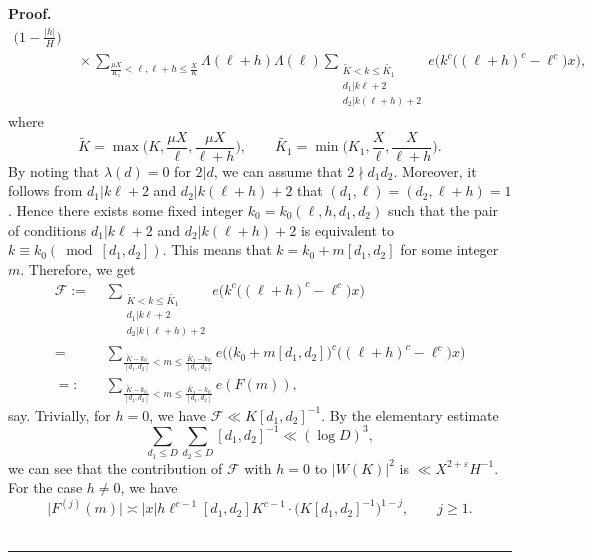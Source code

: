 \documentclass[a4paper,oneside,11pt]{article}%
\newenvironment{proof}[1][Proof]{\noindent \textbf{#1.} }{\  \rule{0.5em}{0.5em}}
\numberwithin{equation}{section}
\begin{document}
\begin{proof}
\begin{align*}
            \bigg(1-\frac{|h|}{H}\bigg)
                 \nonumber \\
 & \,\, \times\sum_{\frac{\mu X}{K_1}<\ell,\ell+h\leqslant\frac{X}{K}}\Lambda(\ell+h)\Lambda(\ell)
        \sum_{\substack{\widetilde{K}<k\leqslant\widetilde{K_1}\\ d_1|k\ell+2\\ d_2|k(\ell+h)+2}}
        e\Big(k^c\big((\ell+h)^c-\ell^c\big)x\Big),
\end{align*}
where
\begin{equation*}
  \widetilde{K}=\max\bigg(K,\frac{\mu X}{\ell},\frac{\mu X}{\ell+h}\bigg),\qquad
  \widetilde{K_1}=\min\bigg(K_1,\frac{X}{\ell},\frac{X}{\ell+h}\bigg).
\end{equation*}
By noting that $\lambda(d)=0$ for $2|d$, we can assume that $2\nmid d_1d_2$. Moreover, it follows from $d_1|k\ell+2$ and
$d_2|k(\ell+h)+2$ that $(d_1,\ell)=(d_2,\ell+h)=1$. Hence there exists some fixed integer $k_0=k_0(\ell,h,d_1,d_2)$ such
that the pair of conditions $d_1|k\ell+2$ and $d_2|k(\ell+h)+2$ is equivalent to $k\equiv k_0(\bmod {[d_1,d_2]})$. This means
that $k=k_0+m[d_1,d_2]$ for some integer $m$. Therefore, we get
\begin{align*}
 \mathscr{F}:= &\,\, \sum_{\substack{\widetilde{K}<k\leqslant\widetilde{K_1}\\ d_1|k\ell+2\\ d_2|k(\ell+h)+2}}
                      e\Big(k^c\big((\ell+h)^c-\ell^c\big)x\Big)
                          \nonumber \\
  = & \,\, \sum_{\frac{\widetilde{K}-k_0}{[d_1,d_2]}<m\leqslant\frac{\widetilde{K_1}-k_0}{[d_1,d_2]}}
            e\Big(\big(k_0+m[d_1,d_2]\big)^c\big((\ell+h)^c-\ell^c\big)x\Big)
                          \nonumber \\
  =: & \,\, \sum_{\frac{\widetilde{K}-k_0}{[d_1,d_2]}<m\leqslant\frac{\widetilde{K_1}-k_0}{[d_1,d_2]}}e(F(m)),
\end{align*}
say. Trivially, for $h=0$, we have $\mathscr{F}\ll K[d_1,d_2]^{-1}$. By the elementary estimate
\begin{equation*}
  \sum_{d_1\leqslant D}\sum_{d_2\leqslant D}[d_1,d_2]^{-1}\ll(\log D)^3,
\end{equation*}
we can see that the contribution of $\mathscr{F}$ with $h=0$ to $|W(K)|^2$ is $\ll X^{2+\varepsilon}H^{-1}$. For the case
$h\not=0$, we have
\begin{equation*}
  \big|F^{(j)}(m)\big|\asymp |x|h\ell^{c-1}[d_1,d_2]K^{c-1}\cdot \big(K[d_1,d_2]^{-1}\big)^{1-j}, \qquad j\geqslant1.

\end{equation*}
\end{proof}
\end{document}
